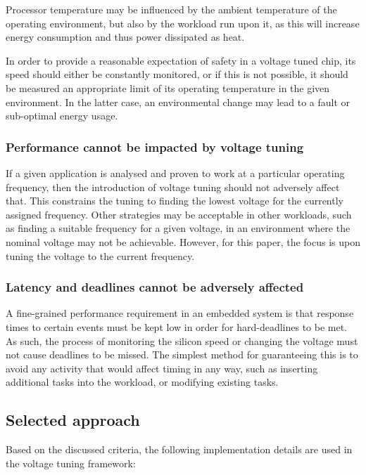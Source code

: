 \documentclass[a4paper,twocolumn,DIV=16]{scrartcl}
\begin{document}
Processor temperature may be influenced by the ambient temperature of the
operating environment, but also by the workload run upon it, as this will
increase energy consumption and thus power dissipated as heat.

In order to provide a reasonable expectation of safety in a voltage tuned chip,
its speed should either be constantly monitored, or if this is not possible, it
should be measured an appropriate limit of its operating temperature in the
given environment. In the latter case, an environmental change may lead to a
fault or sub-optimal energy usage.

\subsubsection*{Performance cannot be impacted by voltage tuning}

If a given application is analysed and proven to work at a particular operating
frequency, then the introduction of voltage tuning should not adversely affect
that. This constrains the tuning to finding the lowest voltage for the currently
assigned frequency. Other strategies may be acceptable in other workloads, such
as finding a suitable frequency for a given voltage, in an environment where the
nominal voltage may not be achievable. However, for this paper, the focus is
upon tuning the voltage to the current frequency.

\subsubsection*{Latency and deadlines cannot be adversely affected}

A fine-grained performance requirement in an embedded system is that response
times to certain events must be kept low in order for hard-deadlines to be met.
As such, the process of monitoring the silicon speed or changing the voltage
must not cause deadlines to be missed. The simplest method for guaranteeing this
is to avoid any activity that would affect timing in any way, such as inserting
additional tasks into the workload, or modifying existing tasks.

\subsection{Selected approach}

Based on the discussed criteria, the following implementation details are used
in the voltage tuning framework:
\end{document}
